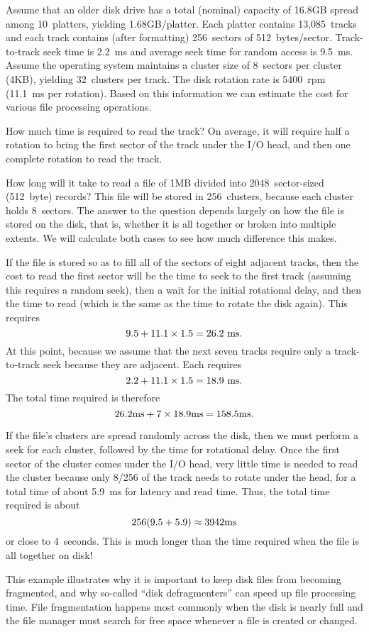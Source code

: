 \vspace{-\smallskipamount}
\begin{example}
\label{DiskExamp}
Assume that an older disk drive has a total (nominal) capacity of
16.8GB spread among 10~platters, yielding 1.68GB/platter.
Each platter contains 13,085~tracks and each track contains (after
formatting) 256~sectors of 512~bytes/sector.
Track-to-track seek time is 2.2~ms and average seek time for random
access is 9.5~ms.
Assume the operating system
maintains a cluster size
of 8~sectors per cluster (4KB), yielding 32~clusters per track.
The disk rotation rate is 5400~rpm (11.1~ms per rotation).
Based on this information we can estimate
the cost for various file processing operations.

How much time is required to read the track?
On average, it will require half a rotation to bring the first sector
of the track under the I/O head, and then one complete rotation to
read the track.

How long will it take to read a file of 1MB divided into
2048~sector-sized (512~byte) records?
This file will be stored in 256~clusters, because  each cluster holds
8~sectors.
The answer to the question depends largely on how the file
is stored on the disk, that is, whether it is all together or broken
into multiple extents.
We will calculate both cases to see how much difference this makes.

If the file is stored so as to fill all of the sectors of eight
adjacent tracks, then the cost to read the first sector will be the
time to seek to the first track (assuming this requires a random
seek), then a wait for the initial rotational delay,
and then the time to read (which is the same as the time to rotate the
disk again).
This requires
\[9.5 + 11.1 \times 1.5 = 26.2 {\rm \ ms.}\]
\noindent At this point, because we assume that the next seven tracks
require only
a track-to-track seek because they are adjacent.
Each requires
\[2.2 + 11.1 \times 1.5 = 18.9 {\rm \ ms.}\]
The total time required is therefore
\[26.2{\rm ms} + 7 \times 18.9 {\rm ms} = 158.5 {\rm ms}.\]

If the file's clusters are spread randomly across the
disk, then we must perform a seek for each cluster, followed by the
time for rotational delay.
Once the first sector of the cluster comes under the I/O head, very
little time is needed to read the cluster because only 8/256 of the
track needs to rotate under the head, for a total time of about
5.9~ms for latency and read time.
Thus, the total time required is about
\[ 256 (9.5 + 5.9) \approx 3942 {\rm ms}\]
or close to 4~seconds.
This is much longer than the time required when the file is all
together on disk!

This example illustrates why it is important to keep disk files from
becoming fragmented,
and why so-called ``disk defragmenters'' can speed up file
processing time.
File fragmentation happens most commonly when the disk is nearly full
and the file manager must search for free space
whenever a file is created or changed.
\end{example}
